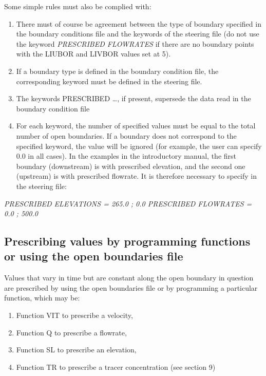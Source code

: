  Some simple rules must also be complied with:

\begin{enumerate}
\item  There must of course be agreement between the type of boundary specified in the boundary conditions file and the keywords of the steering file (do not use the keyword \textit{PRESCRIBED FLOWRATES} if there are no boundary points with the LIUBOR and LIVBOR values set at 5).

\item  If a boundary type is defined in the boundary condition file, the corresponding keyword must be defined in the steering file.

\item  The keywords PRESCRIBED {\dots}, if present, supersede the data read in the boundary condition file

\item  For each keyword, the number of specified values must be equal to the total number of open boundaries. If a boundary does not correspond to the specified keyword, the value will be ignored (for example, the user can specify 0.0 in all cases). In the examples in the introductory manual, the first boundary (downstream) is with prescribed elevation, and the second one (upstream) is with prescribed flowrate. It is therefore necessary to specify in the steering file:
\end{enumerate}

   \textit{PRESCRIBED ELEVATIONS = 265.0 ; 0.0   PRESCRIBED FLOWRATES = 0.0 ; 500.0}


\subsection{ Prescribing values by programming functions or using the open boundaries file}

 Values that vary in time but are constant along the open boundary in question are prescribed by using the open boundaries file or by programming a particular function, which may be:

\begin{enumerate}
\item  Function VIT to prescribe a velocity,

\item  Function  Q to prescribe a flowrate,

\item  Function  SL to prescribe an elevation,

\item  Function TR to prescribe a tracer concentration (see section 9)
\end{enumerate}

